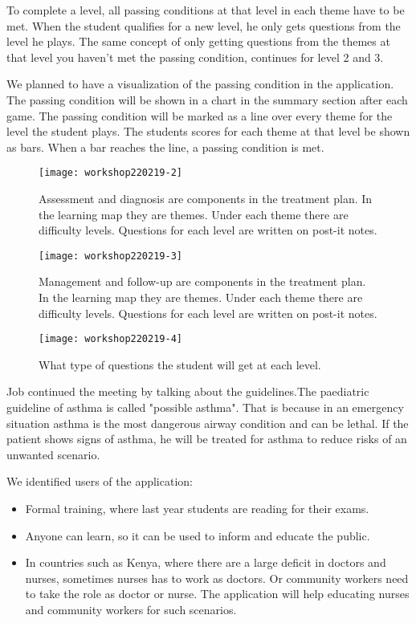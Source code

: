 To complete a level, all passing conditions at that level in each theme have to be met. When the student qualifies for a new level, he only gets questions from the level he plays. The same concept of only getting questions from the themes at that level you haven't met the passing condition, continues for level 2 and 3. 

We planned to have a visualization of the passing condition in the application. The passing condition will be shown in a chart in the summary section after each game. The passing condition will be marked as a line over every theme for the level the student plays. The students scores for each theme at that level be shown as bars. When a bar reaches the line, a passing condition is met.




\begin{figure}[h!]
	\caption {Assessment and diagnosis are components in the treatment plan. In the learning map they are themes. Under each theme there are difficulty levels. Questions for each level are written on post-it notes.}
	\texttt{[image: workshop220219-2]}
\end{figure}

\begin{figure}[h!]
	\caption {Management and follow-up are components in the treatment plan. In the learning map they are themes. Under each theme there are difficulty levels. Questions for each level are written on post-it notes.}
	\texttt{[image: workshop220219-3]}
\end{figure}

\begin{figure}[h!]
	\caption {What type of questions the student will get at each level.}
	\texttt{[image: workshop220219-4]}
\end{figure}

Job continued the meeting by talking about the guidelines.The paediatric guideline of asthma is called "possible asthma". That is because in an emergency situation asthma is the most dangerous airway condition and can be lethal. If the patient shows signs of asthma, he will be treated for asthma to reduce risks of an unwanted scenario.

We identified users of the application: 
\begin{itemize}
	\item Formal training, where last year students are reading for their exams.
	\item Anyone can learn, so it can be used to inform and educate the public.
	\item In countries such as Kenya, where there are a large deficit in doctors and nurses, sometimes nurses has to work as doctors. Or community workers need to take the role as doctor or nurse. The application will help educating nurses and community workers for such scenarios.
\end{itemize}
 
